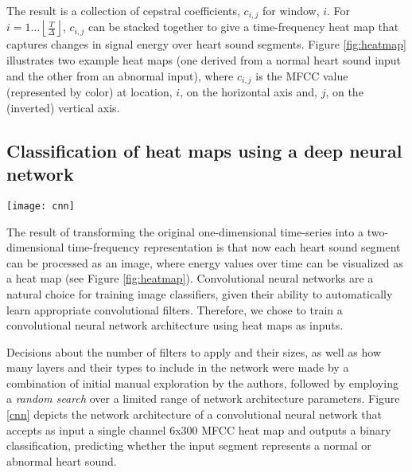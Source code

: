 \documentclass{article}
\begin{document}
\begin{enumerate}
The result is a collection of cepstral coefficients, $c_{i,j}$ for window, $i$. For $i = 1 \ldots \left \lfloor{\frac{T}{\Delta}}\right \rfloor$, $c_{i,j}$ can be stacked together to give a time-frequency heat map that captures changes in signal energy over heart sound segments. Figure \ref{fig:heatmap} illustrates two example heat maps (one derived from a normal heart sound input and the other from an abnormal input), where $c_{i,j}$ is the MFCC value (represented by color) at location, $i$, on the horizontal axis and, $j$, on the (inverted) vertical axis.

\end{enumerate}

\subsection{Classification of heat maps using a deep neural network}
\label{sec:architecture}

\begin{figure*}[ht]
\texttt{[image: cnn]}
\caption{Convolutional neural network architecture for predicting normal versus abnormal heart sounds using MFCC heat maps as input}
\label{cnn}
\end{figure*}

The result of transforming the original one-dimensional time-series into a two-dimensional time-frequency representation is that now each heart sound segment can be processed as an image, where energy values over time can be visualized as a heat map (see Figure \ref{fig:heatmap}). Convolutional neural networks are a natural choice for training image classifiers, given their ability to automatically learn appropriate convolutional filters. Therefore, we chose to train a convolutional neural network architecture using heat maps as inputs. 

Decisions about the number of filters to apply and their sizes, as well as how many layers and their types to include in the network were made by a combination of initial manual exploration by the authors, followed by employing a \emph{random search} over a limited range of network architecture parameters. Figure \ref{cnn} depicts the network architecture of a convolutional neural network that accepts as input a single channel 6x300 MFCC heat map and outputs a binary classification, predicting whether the input segment represents a normal or abnormal heart sound. 
\end{document}
